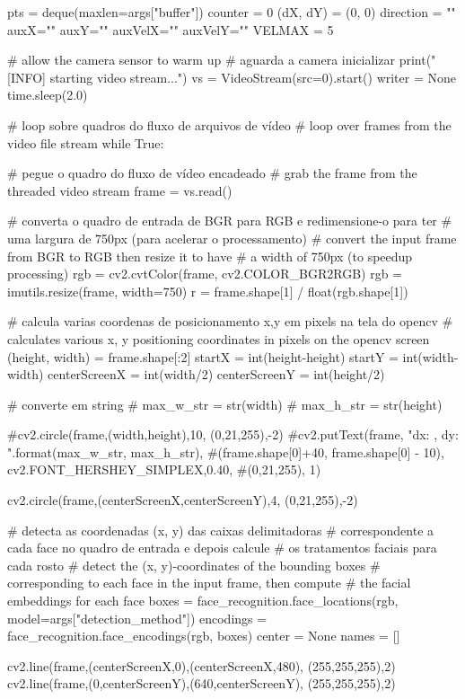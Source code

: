 \begin{apendicesenv}
\begin{python_}
pts = deque(maxlen=args["buffer"])
counter = 0
(dX, dY) = (0, 0)
direction = ""
auxX=""
auxY=""
auxVelX=""
auxVelY=""
VELMAX = 5


# allow the camera sensor to warm up
# aguarda a camera inicializar
print("[INFO] starting video stream...")
vs = VideoStream(src=0).start()
writer = None
time.sleep(2.0)

# loop sobre quadros do fluxo de arquivos de vídeo
# loop over frames from the video file stream
while True:

	# pegue o quadro do fluxo de vídeo encadeado
	# grab the frame from the threaded video stream
	frame = vs.read()
	
	# converta o quadro de entrada de BGR para RGB e redimensione-o para ter
	# uma largura de 750px (para acelerar o processamento)
	# convert the input frame from BGR to RGB then resize it to have
	# a width of 750px (to speedup processing)
	rgb = cv2.cvtColor(frame, cv2.COLOR_BGR2RGB)
	rgb = imutils.resize(frame, width=750)
	r = frame.shape[1] / float(rgb.shape[1])
	
	# calcula varias coordenas de posicionamento x,y em pixels na tela do opencv
	# calculates various x, y positioning coordinates in pixels on the opencv screen
	(height, width) = frame.shape[:2]
	startX = int(height-height)
	startY = int(width-width)
	centerScreenX = int(width/2)
	centerScreenY = int(height/2)
	
	# converte em string
	# max_w_str = str(width)
	# max_h_str = str(height) 
	
	#cv2.circle(frame,(width,height),10, (0,21,255),-2)
	#cv2.putText(frame, "dx: {}, dy: {}".format(max_w_str, max_h_str),
	#(frame.shape[0]+40, frame.shape[0] - 10), cv2.FONT_HERSHEY_SIMPLEX,0.40, 
	#(0,21,255), 1)
	
	cv2.circle(frame,(centerScreenX,centerScreenY),4, (0,21,255),-2)
	
	# detecta as coordenadas (x, y) das caixas delimitadoras
	# correspondente a cada face no quadro de entrada e depois calcule
	# os tratamentos faciais para cada rosto
	# detect the (x, y)-coordinates of the bounding boxes
	# corresponding to each face in the input frame, then compute
	# the facial embeddings for each face
	boxes = face_recognition.face_locations(rgb, model=args["detection_method"])
	encodings = face_recognition.face_encodings(rgb, boxes)
	center = None
	names = []	
	
	cv2.line(frame,(centerScreenX,0),(centerScreenX,480), (255,255,255),2) 
	cv2.line(frame,(0,centerScreenY),(640,centerScreenY), (255,255,255),2) 
	

\end{python_}
\end{apendicesenv}
